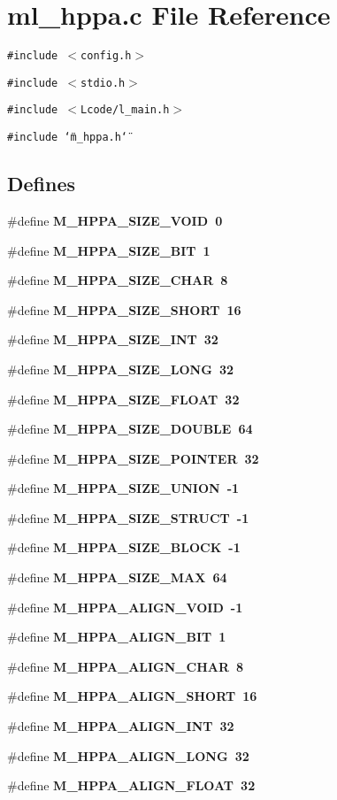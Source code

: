 \section{ml\_\-hppa.c File Reference}
\label{ml__hppa_8c}
{\tt \#include $<$config.h$>$}\par
{\tt \#include $<$stdio.h$>$}\par
{\tt \#include $<$Lcode/l\_\-main.h$>$}\par
{\tt \#include \char`\"{}m\_\-hppa.h\char`\"{}}\par
\subsection*{Defines}
\begin{CompactItemize}
\item 
\#define \bf{M\_\-HPPA\_\-SIZE\_\-VOID}~0
\item 
\#define \bf{M\_\-HPPA\_\-SIZE\_\-BIT}~1
\item 
\#define \bf{M\_\-HPPA\_\-SIZE\_\-CHAR}~8
\item 
\#define \bf{M\_\-HPPA\_\-SIZE\_\-SHORT}~16
\item 
\#define \bf{M\_\-HPPA\_\-SIZE\_\-INT}~32
\item 
\#define \bf{M\_\-HPPA\_\-SIZE\_\-LONG}~32
\item 
\#define \bf{M\_\-HPPA\_\-SIZE\_\-FLOAT}~32
\item 
\#define \bf{M\_\-HPPA\_\-SIZE\_\-DOUBLE}~64
\item 
\#define \bf{M\_\-HPPA\_\-SIZE\_\-POINTER}~32
\item 
\#define \bf{M\_\-HPPA\_\-SIZE\_\-UNION}~-1
\item 
\#define \bf{M\_\-HPPA\_\-SIZE\_\-STRUCT}~-1
\item 
\#define \bf{M\_\-HPPA\_\-SIZE\_\-BLOCK}~-1
\item 
\#define \bf{M\_\-HPPA\_\-SIZE\_\-MAX}~64
\item 
\#define \bf{M\_\-HPPA\_\-ALIGN\_\-VOID}~-1
\item 
\#define \bf{M\_\-HPPA\_\-ALIGN\_\-BIT}~1
\item 
\#define \bf{M\_\-HPPA\_\-ALIGN\_\-CHAR}~8
\item 
\#define \bf{M\_\-HPPA\_\-ALIGN\_\-SHORT}~16
\item 
\#define \bf{M\_\-HPPA\_\-ALIGN\_\-INT}~32
\item 
\#define \bf{M\_\-HPPA\_\-ALIGN\_\-LONG}~32
\item 
\#define \bf{M\_\-HPPA\_\-ALIGN\_\-FLOAT}~32

\end{CompactItemize}

